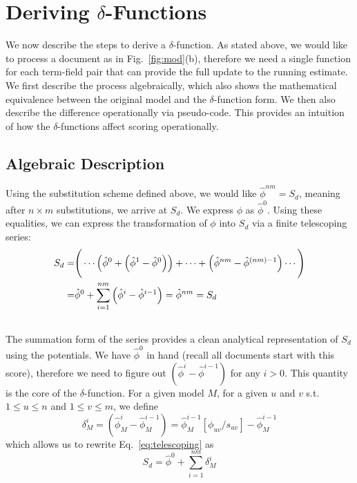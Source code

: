 \documentclass{sig-alternate}
\begin{document}
\section{Deriving {\large $\delta$}-Functions} \label{sec:methods}
We now describe the steps to derive a $\delta$-function. As stated above, we would like to process a document as in Fig.~\ref{fig:mod}(b), therefore we need a single function for each term-field pair that can provide the full update to the running estimate. We first describe the process algebraically, which also shows the mathematical equivalence between the original model and the $\delta$-function form. We then also describe the difference operationally via pseudo-code. This provides an intuition of how the $\delta$-functions affect scoring operationally. 
\subsection{Algebraic Description}
Using the substitution scheme defined above, we would like ${\hat \phi^{nm}} = S_{d}$, meaning after $n \times m$ substitutions, we arrive at $S_{d}$. We express $\phi$ as ${\hat \phi^{0}}$. Using these equalities, we can express the transformation of $\phi$ into $S_{d}$ via a finite telescoping series:
\begin{align}
S_{d} =& \Bigg( \cdots \left( {\hat \phi^{0}} + \left({\hat \phi^{1}} - {\hat \phi^{0}} \right) \right)  + \cdots + \left({\hat \phi^{nm}} - {\hat \phi^{(nm)-1}} \right) \cdots \Bigg) \notag \\
=&{\hat \phi^{0}} + \sum_{i=1}^{nm} \left({\hat \phi^{i}} - {\hat \phi^{i-1}} \right) = {\hat \phi^{nm}} = S_{d} \label{eq:telescoping}  \\ \notag
\end{align}
The summation form of the series provides a clean analytical representation of $S_{d}$ using the potentials. We have ${\hat \phi^{0}}$ in hand (recall all documents start with this score), therefore we need to figure out $\left({\hat \phi^{i}} - {\hat \phi^{i-1}} \right)$ for any $i > 0$. This quantity is the core of the $\delta$-function. For a given model $M$, for a given $u$ and $v$ s.t. $1 \leq u \leq n$ and $1 \leq v \leq m$, we define
\begin{equation}
\delta^{i}_{M} = \left({\hat \phi_{M}^{i}} - {\hat \phi_{M}^{i-1}} \right) = {\hat \phi_{M}^{i-1}}[\phi_{uv}/s_{uv}] - {\hat \phi_{M}^{i-1}}
\label{eq:delta-generic}
\end{equation}
which allows us to rewrite Eq.~\ref{eq:telescoping} as
\begin{equation*}
S_{d} = {\hat \phi^{0}} + \sum_{i=1}^{nm} \delta^{i}_{M}
\end{equation*}
\end{document}
